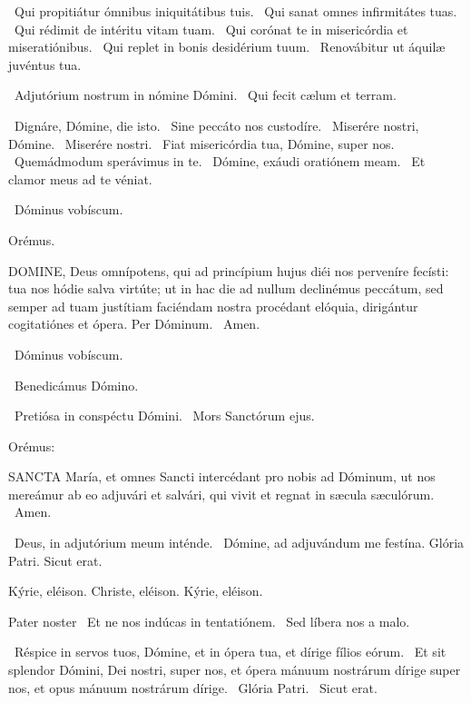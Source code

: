 \V\ Qui propitiátur ómnibus iniquitátibus tuis. \R\ Qui sanat omnes infirmitátes tuas. \V\ Qui rédimit de intéritu vitam tuam. \R\ Qui corónat te in misericórdia et miseratiónibus. \V\ Qui replet in bonis desidérium tuum. \R\ Renovábitur ut áquilæ juvéntus tua.


\V\ Adjutórium nostrum in nómine Dómini. \R\ Qui fecit cælum et terram.


\V\ Dignáre, Dómine, die isto. \R\ Sine peccáto nos custodíre. \V\ Miserére nostri, Dómine. \R\ Miserére nostri. \V\ Fiat misericórdia tua, Dómine, super nos. \R\ Quemádmodum sperávimus in te. \V\ Dómine, exáudi oratiónem meam. \R\ Et clamor meus ad te véniat.

\V\ Dóminus vobíscum.

Orémus. 

\lettrine[lines=2]{D}{OMINE}, Deus omnípotens, qui ad princípium hujus diéi nos perveníre fecísti: tua nos hódie salva virtúte; ut in hac die ad nullum declinémus peccátum, sed semper ad tuam justítiam faciéndam nostra procédant elóquia, dirigántur cogitatiónes et ópera. Per Dóminum. \R\ Amen.

\V\ Dóminus vobíscum.

\V\ Benedicámus Dómino.


\V\ Pretiósa in conspéctu Dómini. \R\ Mors Sanctórum ejus.

 Orémus:


\lettrine[lines=2]{S}{ANCTA} María, et omnes Sancti intercédant pro nobis ad Dóminum, ut nos mereámur ab eo adjuvári et salvári, qui vivit et regnat in sæcula sæculórum. \R\ Amen.

\V\ Deus, in adjutórium meum inténde. \R\ Dómine, ad adjuvándum me festína.  Glória Patri. Sicut erat.

Kýrie, eléison. Christe, eléison. Kýrie, eléison.

Pater noster  \V\ Et ne nos indúcas in tentatiónem. \R\ Sed líbera nos a malo.

\V\ Réspice in servos tuos, Dómine, et in ópera tua, et dírige fílios eórum. \R\ Et sit splendor Dómini, Dei nostri, super nos, et ópera mánuum nostrárum dírige super nos, et opus mánuum nostrárum dírige. \V\ Glória Patri. \R\ Sicut erat.

